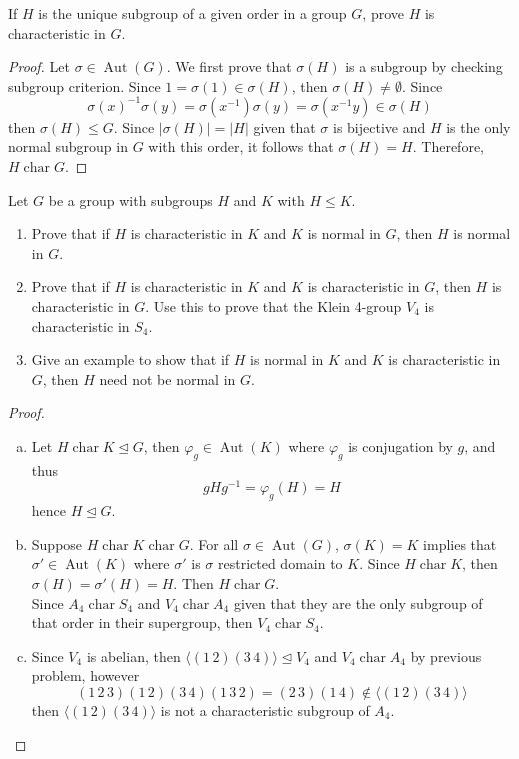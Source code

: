 \documentclass{article}
\newenvironment{problem}[2][Problem]{\begin{trivlist}
\item[\hskip \labelsep {\bfseries #1}\hskip \labelsep {\bfseries #2.}]}{\end{trivlist}}
\DeclareMathOperator{\Aut}{Aut}
\DeclareMathOperator{\Char}{char}
\begin{document}
\begin{problem}{7}
    If $H$ is the unique subgroup of a given order in a group $G$, prove $H$ is characteristic in $G$.
\end{problem}
\begin{proof}
    Let $\sigma\in \Aut(G)$. We first prove that $\sigma(H)$ is a subgroup by checking subgroup criterion. Since $1 =\sigma(1)\in \sigma(H)$, then $\sigma (H)\neq \emptyset$. Since 
    \[
    \sigma(x)^{-1}\sigma(y) = \sigma(x^{-1})\sigma(y)=\sigma(x^{-1}y)\in \sigma (H)
    \]
    then $\sigma(H)\leq G$. Since $|\sigma(H)|=|H|$ given that $\sigma$ is bijective and $H$ is the only normal subgroup in $G$ with this order, it follows that $\sigma(H)=H$. Therefore, $H \Char G$.
\end{proof}
\begin{problem}{8}
    Let $G$ be a group with subgroups $H$ and $K$ with $H \leq K$.
\begin{enumerate}
    \item[(a)] Prove that if $H$ is characteristic in $K$ and $K$ is normal in $G$, then $H$ is normal in $G$.
    \item[(b)] Prove that if $H$ is characteristic in $K$ and $K$ is characteristic in $G$, then $H$ is characteristic in $G$. Use this to prove that the Klein 4-group $V_4$ is characteristic in $S_4$.
    \item[(c)] Give an example to show that if $H$ is normal in $K$ and $K$ is characteristic in $G$, then $H$ need not be normal in $G$.
\end{enumerate}
\end{problem}
\begin{proof}
    \begin{enumerate}[(a)]
        \item Let $H \Char K \trianglelefteq G$, then $\varphi_g \in \Aut(K)$ where $\varphi_g$ is conjugation by $g$, and thus 
        \[
        g Hg^{-1}=\varphi_g(H)=H
        \]
        hence $H \trianglelefteq G$.
        \item Suppose $H \Char K \Char G$. For all $\sigma \in \Aut(G)$, 
        $
        \sigma(K)=K$ implies that $ \sigma' \in \Aut(K)
$ where $\sigma'$ is $\sigma$ restricted domain to $K$. 
        Since $H \Char K$, then $\sigma(H) = \sigma'(H)= H$. Then $H \Char G$. \\
        Since $A_4 \Char S_4$ and $V_4 \Char A_4$ given that they are the only subgroup of that order in their supergroup, then $V_4 \Char S_4$.
        \item Since $V_4$ is abelian, then $\langle (1\, 2)(3\, 4) \rangle \trianglelefteq V_4$ and $V_4 \Char A_4$ by previous problem, however
        \[
        (1\, 2\, 3)(1\, 2)(3\, 4)(1\, 3\, 2)=(2\, 3)(1\, 4)\notin \langle (1\, 2)(3\, 4)\rangle 
        \]
        then $\langle (1\, 2)(3\, 4)\rangle $ is not a characteristic subgroup of $A_4$.
    \end{enumerate}
\end{proof}
\end{document}
